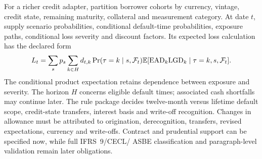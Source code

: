 

For a richer credit adapter, partition borrower cohorts by currency, vintage,
credit state, remaining maturity, collateral and measurement category. At date
$t$, supply scenario probabilities, conditional default-time probabilities,
exposure paths, conditional loss severity and discount factors. Its expected
loss calculation has the declared form
\[
 L_t=\sum_s p_s\sum_{k\in H}
  d_{t,k}\Pr(\tau=k\mid s,\mathcal F_t)
  \mathbb{E}[\mathrm{EAD}_k\mathrm{LGD}_k\mid\tau=k,s,\mathcal F_t].
\]
The conditional product expectation retains dependence between exposure and
severity. The horizon $H$ concerns eligible default times; associated cash
shortfalls may continue later. The rule package decides twelve-month versus
lifetime default scope, credit-state transfers, interest basis and write-off
recognition. Changes in allowance must be attributed to origination,
derecognition, transfers, revised expectations, currency and write-offs.
Contract and prudential support can be specified now, while full IFRS~9/CECL/
ASBE classification and paragraph-level validation remain later obligations.




